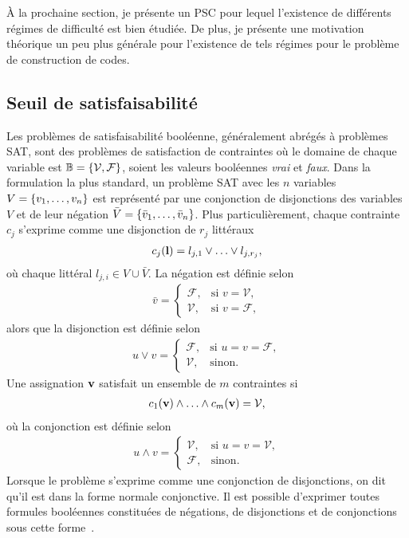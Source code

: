 À la prochaine section, 
je présente un PSC pour lequel l'existence de différents régimes de difficulté 
est bien étudiée. 
De plus, je présente une motivation théorique un peu plus générale pour l'existence de
tels régimes pour le problème de construction de codes.

\subsection{Seuil de satisfaisabilité}

Les problèmes de satisfaisabilité booléenne,
généralement abrégés à problèmes SAT,
sont des problèmes de satisfaction de contraintes où le domaine de chaque variable
est $\mathbb B = \qty{\mathcal V, \mathcal F}$,
soient les valeurs booléennes \textit{vrai} et \textit{faux}.
Dans la formulation la plus standard,
un problème SAT avec les $n$ variables $V = \qty{v_1,\ldots, v_n}$
est représenté par une conjonction de disjonctions des variables $V$ et de leur négation 
$\bar V = \qty{\bar v_1, \ldots, \bar v_n}$.
Plus particulièrement,
chaque contrainte $c_j$ s'exprime comme une disjonction de $r_j$ littéraux
\begin{align}
  c_j(\vb l) = l_{j, 1} \lor \ldots \lor l_{j, r_{j}},
\end{align}
où chaque littéral $l_{j, i} \in V \cup \bar V$.
La négation est définie selon
\begin{align}
  \bar v = 
  \begin{cases}
    \mathcal F, &\text{si } v = \mathcal V, \\
    \mathcal V, &\text{si } v = \mathcal F,
  \end{cases}
\end{align}
alors que la disjonction est définie selon
\begin{align}
  u \lor v = 
  \begin{cases}
    \mathcal F, &\text{si } u = v = \mathcal F, \\
    \mathcal V, &\text{sinon}.
  \end{cases}
\end{align}
Une assignation $\vb v$ satisfait un ensemble de $m$ contraintes si
\begin{align}
  c_1(\vb v) \land \ldots \land c_m(\vb v) = \mathcal V,
\end{align}
où la conjonction est définie selon
\begin{align}
  u \land v = 
  \begin{cases}
    \mathcal V, &\text{si } u = v = \mathcal V, \\
    \mathcal F, &\text{sinon}.
  \end{cases}
\end{align}
Lorsque le problème s'exprime comme une conjonction de disjonctions,
on dit qu'il est dans la forme normale conjonctive.
Il est possible d'exprimer toutes formules booléennes constituées de négations,
de disjonctions et de conjonctions sous cette forme~\cite{tseitin_complexity_1983}.

